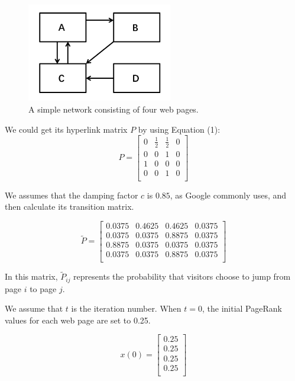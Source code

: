 \documentclass[lettersize,journal,12pt,conference]{IEEEtran}
\begin{document}
\begin{figure}[h]
	\centering
	\includegraphics[width=2.5in]{images/fig5.png}
	\caption{A simple network consisting of four web pages.}
	\label{fig4}
\end{figure}

We could get its hyperlink matrix $P$ by using Equation (1):
\begin{equation}
	\label{eq:12}
	P = \begin{bmatrix}
		0 & \frac{1}{2} & \frac{1}{2} & 0 \\
		0 & 0 & 1 & 0 \\
		1 & 0 & 0 & 0 \\
		0 & 0 & 1 & 0 \\
		\end{bmatrix}
\end{equation}

We assumes that the damping factor $c$ is $0.85$, as Google commonly uses, and then calculate its transition matrix.

\begin{equation}
	\label{eq:13}
	\widetilde{P} = \begin{bmatrix}
		0.0375 & 0.4625 & 0.4625 & 0.0375 \\
		0.0375 & 0.0375 & 0.8875 & 0.0375 \\
		0.8875 & 0.0375 & 0.0375 & 0.0375 \\
		0.0375 & 0.0375 & 0.8875 & 0.0375 \\
		\end{bmatrix}
\end{equation}

In this matrix, $\widetilde{P}_{ij}$ represents the probability that visitors choose to jump from page $i$ to page $j$.

We assume that $t$ is the iteration number. When $t = 0$, the initial PageRank values for each web page are set to 0.25.

\begin{equation}
	\label{eq:14}
	x(0) = \begin{bmatrix}
		0.25 \\
		0.25 \\
		0.25 \\
		0.25 \\
		\end{bmatrix}
\end{equation}
\end{document}

